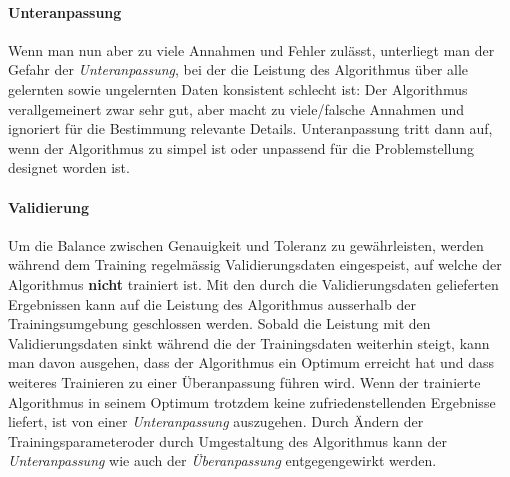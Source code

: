 \paragraph{Unteranpassung} Wenn man nun aber zu viele Annahmen und Fehler zulässt, unterliegt man der Gefahr der \textit{Unteranpassung}, bei der die Leistung des Algorithmus über alle gelernten sowie ungelernten Daten konsistent schlecht ist: Der Algorithmus verallgemeinert zwar sehr gut, aber macht zu viele/falsche Annahmen und ignoriert für die Bestimmung relevante Details. Unteranpassung tritt dann auf, wenn der Algorithmus zu simpel ist oder unpassend für die Problemstellung designet worden ist.

\paragraph{Validierung} Um die Balance zwischen Genauigkeit und Toleranz zu gewährleisten, werden während dem Training regelmässig Validierungsdaten eingespeist, auf welche der Algorithmus \textbf{nicht} trainiert ist. Mit den durch die Validierungsdaten gelieferten Ergebnissen kann auf die Leistung des Algorithmus ausserhalb der Trainingsumgebung geschlossen werden. Sobald die Leistung mit den Validierungsdaten sinkt während die der Trainingsdaten weiterhin steigt, kann man davon ausgehen, dass der Algorithmus ein Optimum erreicht hat und dass weiteres Trainieren zu einer Überanpassung führen wird. Wenn der trainierte Algorithmus in seinem Optimum trotzdem keine zufriedenstellenden Ergebnisse liefert, ist von einer \textit{Unteranpassung} auszugehen. Durch Ändern der Trainingsparameter\footnotemark oder durch Umgestaltung des Algorithmus kann der \textit{Unteranpassung} wie auch der \textit{Überanpassung} entgegengewirkt werden.


